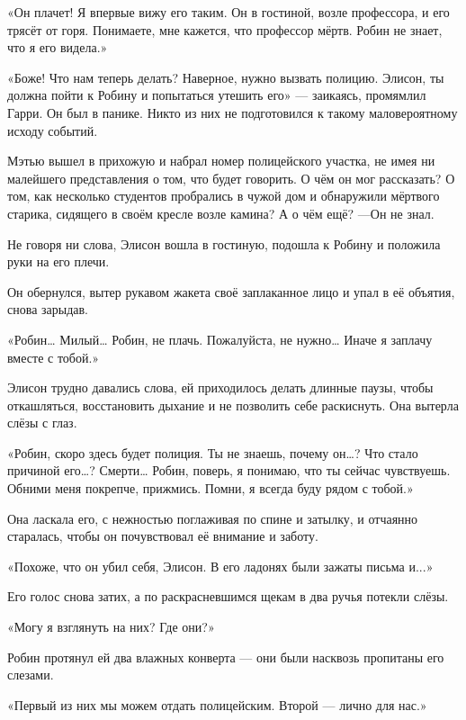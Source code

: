 \documentclass[a5paper, 9pt,
final, openany, twoside=true]{memoir}
\begin{document}
«Он плачет! Я впервые вижу его таким. Он в гостиной, возле профессора, и его трясёт от горя. Понимаете, мне кажется, что профессор мёртв. Робин не знает, что я его видела.»

«Боже! Что нам теперь делать? Наверное, нужно вызвать полицию. Элисон, ты должна пойти к Робину и попытаться утешить его» — заикаясь, промямлил Гарри. Он был в панике. Никто из них не подготовился к такому маловероятному исходу событий.

Мэтью вышел в прихожую и набрал номер полицейского участка, не имея ни малейшего представления о том, что будет говорить. О чём он мог рассказать? О том, как несколько студентов пробрались в чужой дом и обнаружили мёртвого старика, сидящего в своём кресле возле камина? А о чём ещё? —Он не знал.\bigskip

Не говоря ни слова, Элисон вошла в гостиную, подошла к Робину и положила руки на его плечи.

Он обернулся, вытер рукавом жакета своё заплаканное лицо и упал в её объятия, снова зарыдав.

«Робин… Милый… Робин, не плачь. Пожалуйста, не нужно… Иначе я заплачу вместе с тобой.»

Элисон трудно давались слова, ей приходилось делать длинные паузы, чтобы откашляться, восстановить дыхание и не позволить себе раскиснуть. Она вытерла слёзы с глаз.

«Робин, скоро здесь будет полиция. Ты не знаешь, почему он…? Что стало причиной его…? Смерти… Робин, поверь, я понимаю, что ты сейчас чувствуешь. Обними меня покрепче, прижмись. Помни, я всегда буду рядом с тобой.»

Она ласкала его, с нежностью поглаживая по спине и затылку, и отчаянно старалась, чтобы он почувствовал её внимание и заботу.

«Похоже, что он убил себя, Элисон. В его ладонях были зажаты письма и...»

Его голос снова затих, а по раскрасневшимся щекам в два ручья потекли слёзы.

«Могу я взглянуть на них? Где они?»

Робин протянул ей два влажных конверта — они были насквозь пропитаны его слезами.

«Первый из них мы можем отдать полицейским. Второй — лично для нас.»
\end{document}
